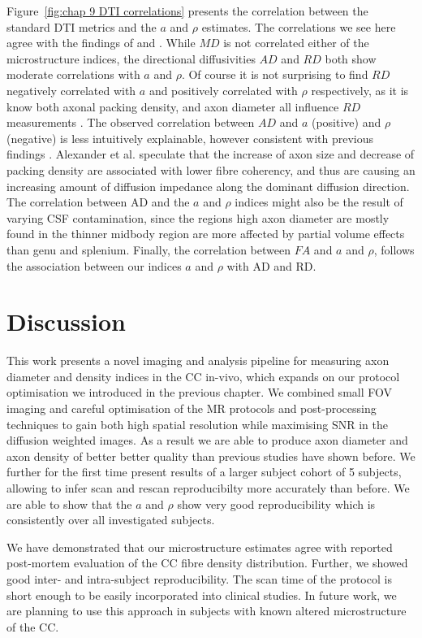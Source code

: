 Figure~\ref{fig:chap 9 DTI correlations} presents the correlation between the standard DTI metrics and the $a$ and $\rho$ estimates. The correlations we see here agree with the findings of \citep{Barazany:2009} and \citep{Alexander:2010}. While $MD$ is not correlated either of the microstructure indices, the directional diffusivities $AD$ and $RD$ both show moderate correlations with $a$ and $\rho$. Of course it is not surprising to find $RD$ negatively correlated with $a$ and positively correlated with $\rho$ respectively, as it is know both axonal packing density, and axon diameter all influence $RD$ measurements \citep{Beaulieu:2002}. The observed correlation between $AD$ and $a$ (positive) and $\rho$ (negative) is less intuitively explainable, however consistent with previous findings \citep{Barazany:2009,Alexander:2010}. Alexander et al. speculate that the increase of axon size and decrease of packing density are associated with lower fibre coherency, and thus are causing an increasing amount of diffusion impedance along the dominant diffusion direction. The correlation between AD and the $a$ and $\rho$ indices might also be the result of varying CSF contamination, since the regions high axon diameter are mostly found in the thinner midbody region are more affected by partial volume effects than genu and splenium. Finally, the correlation between $FA$ and $a$ and $\rho$, follows the association between our indices $a$ and $\rho$ with AD and RD.  
\egroup %
\FloatBarrier
\section{Discussion}
This work presents a novel imaging and analysis pipeline for measuring axon diameter and density indices in the CC in-vivo, which expands on our \SFasym{} protocol optimisation we introduced in the previous chapter. We combined small FOV imaging and careful optimisation of the MR protocols and post-processing techniques to gain both high spatial resolution while maximising SNR in the diffusion weighted images. As a result we are able to produce axon diameter and axon density of better better quality than previous studies have shown before. We further for the first time present results of a larger subject cohort of 5 subjects, allowing to infer scan and rescan reproducibilty more accurately than before. We are able to show that the $a$ and $\rho$ show very good reproducibility which is consistently over all investigated subjects. 



 We have demonstrated that our microstructure estimates agree with reported post-mortem evaluation of the CC fibre density distribution. Further, we showed good inter- and intra-subject reproducibility. The scan time of the protocol is short enough to be easily incorporated into clinical studies. In future work, we are planning to use this approach in subjects with known altered microstructure of the CC.